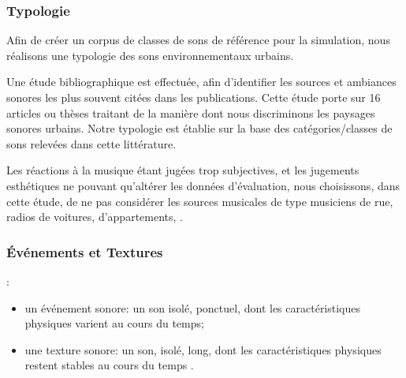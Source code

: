\documentclass[twoside,twocolumn]{article}
\begin{document}
\subsubsection*{Typologie}

Afin de créer un corpus de classes de sons de référence pour la simulation, nous réalisons une typologie des sons environnementaux urbains. 

Une étude bibliographique est effectuée, afin d'identifier les sources et ambiances sonores les plus souvent citées dans les publications. Cette étude porte sur 16 articles ou thèses \cite{maffiolo_caracterisation_1999,raimbault2002simulation,guastavino_etude_2003,defreville2004aactivity,raimbault2005urban,dubois2006cognitive,devergie_relations_2006,guastavino2006ideal,niessen2010categories,maffiolo_caracterisation_1999,beaumont2004pertinence,polack2008perceptive,leobon_analyse_1986,brown2011towards}
traitant de la manière dont nous discriminons les paysages sonores urbains. Notre typologie est établie sur la base des catégories/classes de sons relevées dans cette littérature.

Les réactions à la musique étant jugées trop subjectives, et les jugements esthétiques ne pouvant qu'altérer les données d'évaluation, nous choisissons, dans cette étude, de ne pas considérer les sources musicales de type musiciens de rue, radios de voitures, d'appartements, \etc.

\subsubsection*{Événements et Textures}

 :

\begin{itemize}
\item {un événement sonore}: un son isolé, ponctuel, dont les caractéristiques physiques varient au cours du temps;
\item {une texture sonore}: un son, isolé, long, dont les caractéristiques physiques restent stables au cours du temps \cite{saint1995classification}.
\end{itemize}

\end{document}
